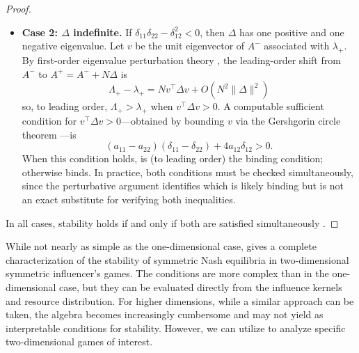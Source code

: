 \documentclass{article}
\begin{document}
\begin{proof}
\begin{itemize}
                    \item \textbf{Case 2: $\Delta$ indefinite.} If 
                    $\delta_{11}\delta_{22} - \delta_{12}^2 < 0$, then $\Delta$ has one positive and one negative eigenvalue. Let $v$ be the unit eigenvector of $A^-$ associated with $\lambda_+$. By first-order eigenvalue perturbation theory \cite[thm.~6.3.12]{horn2012matrix}, the leading-order shift from $A^-$ to $A^+ = A^- + N\Delta$ is
                    \begin{equation}
                        \Lambda_+ - \lambda_+ = N v^\top \Delta v + O(N^2\|\Delta\|^2)
                    \end{equation}
                    so, to leading order, $\Lambda_+ > \lambda_+$ when $v^\top \Delta v > 0$. A computable sufficient condition for $v^\top\Delta v > 0$---obtained by bounding $v$ via the Gershgorin circle theorem \cite[Thm.~6.1.1]{horn2012matrix}---is
                    \begin{equation}
                        (a_{11} - a_{22})(\delta_{11} - \delta_{22}) + 
                        4a_{12}\delta_{12} > 0.
                    \end{equation}
                    When this condition holds,  is (to leading order) the binding condition; otherwise  binds. In practice, both conditions must be checked simultaneously, since the perturbative argument identifies which is likely binding but is not an exact substitute for verifying both inequalities.
                \end{itemize}
                In all cases, stability holds if and only if both  are satisfied simultaneously .
            \end{proof}
            While not nearly as simple as the one-dimensional case,  gives a complete characterization of the stability of symmetric Nash equilibria in two-dimensional symmetric influencer's games. The conditions are more complex than in the one-dimensional case, but they can be evaluated directly from the influence kernels and resource distribution. For higher dimensions, while a similar approach can be taken, the algebra becomes increasingly cumbersome and may not yield as interpretable conditions for stability. However, we can utilize  to analyze specific two-dimensional games of interest.
            
                
\end{document}
